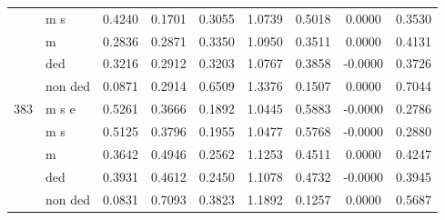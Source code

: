 \documentclass{standalone}
\begin{document}
\begin{tabular}{rlccccccc}
& m s &    0.4240 &    0.1701 &    0.3055 &    1.0739 &    0.5018 &    0.0000 &    0.3530 \\  
& m &    0.2836 &    0.2871 &    0.3350 &    1.0950 &    0.3511 &    0.0000 &    0.4131 \\  
& ded &    0.3216 &    0.2912 &    0.3203 &    1.0767 &    0.3858 &   -0.0000 &    0.3726 \\  
& non ded &    0.0871 &    0.2914 &    0.6509 &    1.3376 &    0.1507 &    0.0000 &    0.7044 \\  \hline
383& m s e &    0.5261 &    0.3666 &    0.1892 &    1.0445 &    0.5883 &   -0.0000 &    0.2786 \\  
& m s &    0.5125 &    0.3796 &    0.1955 &    1.0477 &    0.5768 &   -0.0000 &    0.2880 \\  
& m &    0.3642 &    0.4946 &    0.2562 &    1.1253 &    0.4511 &    0.0000 &    0.4247 \\  
& ded &    0.3931 &    0.4612 &    0.2450 &    1.1078 &    0.4732 &   -0.0000 &    0.3945 \\  
& non ded &    0.0831 &    0.7093 &    0.3823 &    1.1892 &    0.1257 &    0.0000 &    0.5687 \\  
\bottomrule \end{tabular}
\end{document}
